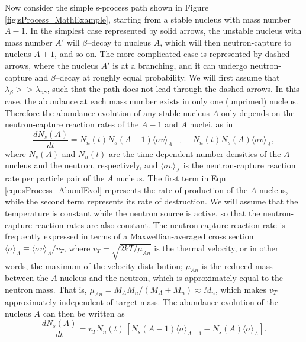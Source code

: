 Now consider the simple s-process path shown in Figure \ref{fig:sProcess_MathExample}, starting from a stable nucleus with mass number $A-1$. In the simplest case represented by solid arrows, the unstable nucleus with mass number $A'$ will $\beta$--decay to nucleus $A$, which will then neutron-capture to nucleus $A+1$, and so on. The more complicated case is represented by dashed arrows, where the nucleus $A'$ is at a branching, and it can undergo neutron-capture and $\beta$--decay at roughly equal probability. We will first assume that $\lambda_{\beta} >> \lambda_{n\gamma}$, such that the path does not lead through the dashed arrows. In this case, the abundance at each mass number exists in only one (unprimed) nucleus. Therefore the abundance evolution of any stable nucleus $A$ only depends on the neutron-capture reaction rates of the $A-1$ and $A$ nuclei, as in
\begin{equation} \label{eqn:sProcess_AbundEvol}
\frac{dN_{s}(A)}{dt} = N_{n}(t)N_{s}(A-1)\langle \sigma v \rangle_{A-1} - N_{n}(t)N_{s}(A)\langle \sigma v \rangle_{A},
\end{equation}
where $N_{s}(A)$ and $N_{n}(t)$ are the time-dependent number densities of the $A$ nucleus and the neutron, respectively, and $\langle \sigma v \rangle_{A}$ is the neutron-capture reaction rate per particle pair of the $A$ nucleus. The first term in Eqn \ref{eqn:sProcess_AbundEvol} represents the rate of production of the $A$ nucleus, while the second term represents its rate of destruction. We will assume that the temperature is constant while the neutron source is active, so that the neutron-capture reaction rates are also constant. The neutron-capture reaction rate is frequently expressed in terms of a Maxwellian-averaged cross section $\langle \sigma \rangle_{A} \equiv \langle \sigma v \rangle_{A} / v_{T}$, where $v_{T} = \sqrt{2kT/\mu_{An}}$ is the thermal velocity, or in other words, the maximum of the velocity distribution; $\mu_{An}$ is the reduced mass between the $A$ nucleus and the neutron, which is approximately equal to the neutron mass. That is, $\mu_{An} = M_{A}M_{n}/(M_{A} + M_{n}) \approx M_{n}$, which makes $v_{T}$ approximately independent of target mass. The abundance evolution of the nucleus $A$ can then be written as
\begin{equation}
\frac{dN_{s}(A)}{dt} = v_{T}N_{n}(t) \, \left[ N_{s}(A-1)\langle \sigma \rangle_{A-1} - N_{s}(A)\langle \sigma \rangle_{A} \right].
\end{equation}

